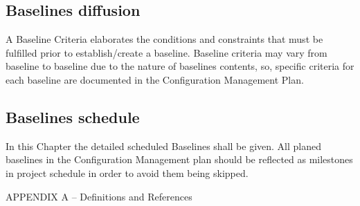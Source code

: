 \documentclass{template/openetcs_article}
\begin{document}
\subsection{Baselines diffusion}
A Baseline Criteria elaborates the conditions and constraints that must be fulfilled prior to establish/create a baseline. Baseline criteria may vary from baseline to baseline due to the nature of baselines contents, so, specific criteria for each baseline are documented in the Configuration Management Plan.

\subsection{Baselines schedule}
In this Chapter the detailed scheduled Baselines shall be given. All planed baselines in the Configuration Management plan should be reflected as milestones in project schedule in order to avoid them being skipped.







APPENDIX
A –	Definitions and References









\end{document}
